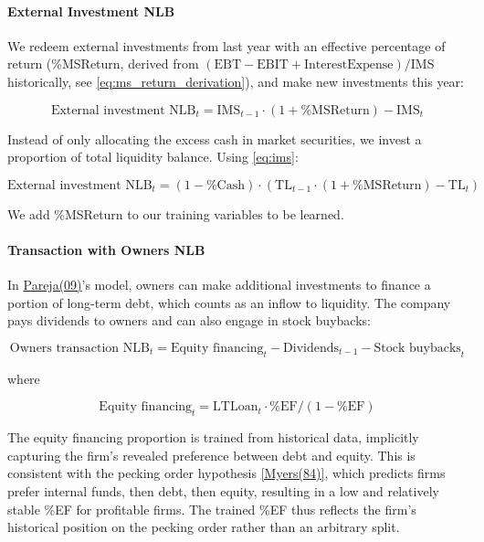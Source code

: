 \documentclass[12pt,a4paper]{article}
\begin{document}
\paragraph{External Investment NLB}

We redeem external investments from last year with an effective
percentage of return (\%MSReturn, derived from
$(\text{EBT} - \text{EBIT} + \text{InterestExpense}) / \text{IMS}$
historically, see \eqref{eq:ms_return_derivation}), and make new investments this year:

\begin{equation}\label{eq:ext_invest_nlb}
\text{External investment NLB}_t = \text{IMS}_{t-1} \cdot (1 + \text{\%MSReturn}) - \text{IMS}_t
\end{equation}

Instead of only allocating the excess cash in market securities, we
invest a proportion of total liquidity balance. Using \eqref{eq:ims}:

\begin{equation}\label{eq:ext_invest_nlb_expanded}
\text{External investment NLB}_t = (1 - \text{\%Cash}) \cdot (\text{TL}_{t-1} \cdot (1 + \text{\%MSReturn}) - \text{TL}_t)
\end{equation}

We add \%MSReturn to our training variables to be learned.

\paragraph{Transaction with Owners NLB}

In \hyperlink{ref:pareja09}{Pareja(09)}'s model, owners can make additional investments to finance a
portion of long-term debt, which counts as an inflow to liquidity. The
company pays dividends to owners and can also engage in stock buybacks:

\begin{equation}\label{eq:owners_nlb}
\text{Owners transaction NLB}_t = \text{Equity financing}_t - \text{Dividends}_{t-1} - \text{Stock buybacks}_t
\end{equation}

where

\begin{equation}\label{eq:equity_financing}
\text{Equity financing}_t = \text{LTLoan}_t \cdot \text{\%EF} / (1 - \text{\%EF})
\end{equation}

The equity financing proportion is trained from historical data, implicitly capturing the firm's revealed preference between debt and equity. This is consistent with the pecking order hypothesis \hyperlink{ref:myers84}{[Myers(84)]}, which predicts firms prefer internal funds, then debt, then equity, resulting in a low and relatively stable \%EF for profitable firms. The trained \%EF thus reflects the firm's historical position on the pecking order rather than an arbitrary split.
\end{document}
